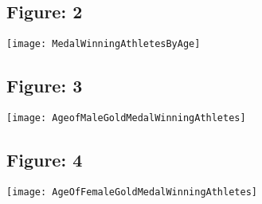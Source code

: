 \documentclass{article}
\begin{document}
\bigbreak

\begin{figure}[ht!]
\centering
\subsection{Figure: 2}
\centering
\texttt{[image: MedalWinningAthletesByAge]}
\end{figure}

\bigbreak

\begin{figure}[ht!]
\centering
\subsection{Figure: 3}
\centering
\texttt{[image: AgeofMaleGoldMedalWinningAthletes]}
\end{figure}

\bigbreak

\begin{figure}[ht!]
\centering
\subsection{Figure: 4}
\centering
\texttt{[image: AgeOfFemaleGoldMedalWinningAthletes]}
\end{figure}
\end{document}
